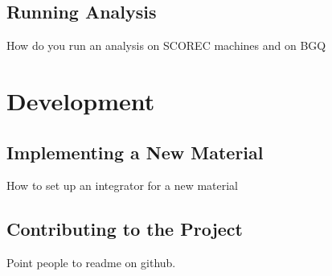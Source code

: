 \documentclass[12pt,draft]{book}
\begin{document}
\section{Running Analysis}
How do you run an analysis on SCOREC machines and on BGQ
\chapter{Development}
\section{Implementing a New Material}
How to set up an integrator for a new material
\section{Contributing to the Project}
Point people to readme on github.

\appendix



\clearpage


\end{document}
